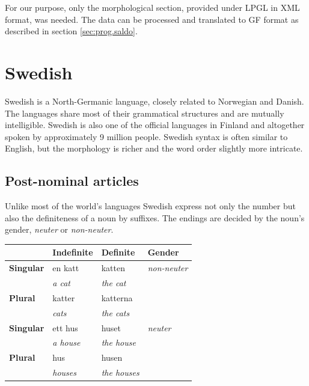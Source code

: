 \documentclass{report}
\begin{document}
For our purpose, only the morphological section, provided under LPGL in XML
format, was needed.
The data can be processed and translated to GF format as described in 
section \ref{sec:prog.saldo}.

\section{Swedish}
\label{sec:swedish}
Swedish \cite[Inl. ]{SAG} is a North-Germanic language,
closely related to Norwegian and Danish. The languages share most of their
grammatical structures and are mutually intelligible. Swedish is also 
one of the official languages in Finland and altogether spoken by approximately 9
million people.
Swedish syntax is often similar to English, but the  morphology is richer and the
word order slightly more intricate.

\subsection{Post-nominal articles} 
\label{sec:swedishnoun}
Unlike most of the world's languages Swedish express not only the number but also
the definiteness of a noun by suffixes. The endings are decided by the noun's gender,
\textit{neuter} or \textit{non-neuter}.\\
\begin{tabular}{l|lll}
                  &\textbf{Indefinite} & \textbf{Definite}& \textbf{Gender} \\
 \hline
\textbf{Singular} & {en katt}        & {katten}           & \textit{non-neuter}\\
                  & \emph{a cat}     & \emph{the cat}     &\\
\textbf{Plural}   & katter           & katterna           &\\
                  &\emph{cats}       & \emph{the cats}    &\\
 \hline
\textbf{Singular} & {ett hus}        & {huset}            & \textit{neuter}\\
                  & \emph{a house}   & \emph{the house}   & \\
\textbf{Plural}   & hus              & husen              & \\
                  & \emph{houses}    & \emph{the houses}  & \\
\end{tabular}\\
\end{document}
